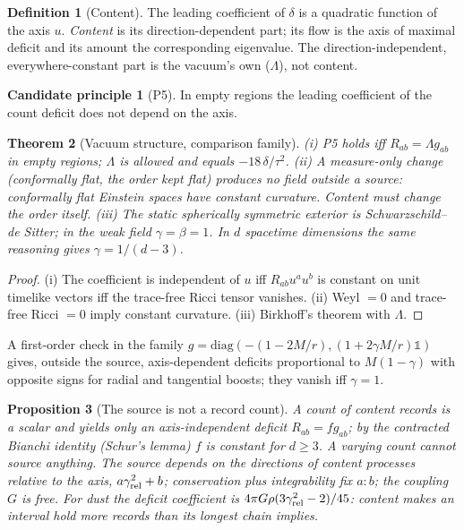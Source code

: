 \documentclass[11pt]{article}
\newtheorem{theorem}{Theorem}
\newtheorem{proposition}[theorem]{Proposition}
\theoremstyle{definition}
\newtheorem{definition}[theorem]{Definition}
\newtheorem{candidate}{Candidate principle}
\theoremstyle{remark}
\begin{document}
\begin{definition}[Content]
The leading coefficient of $\delta$ is a quadratic function of the axis $u$. \emph{Content} is its direction-dependent part; its flow is the axis of maximal deficit and its amount the corresponding eigenvalue. The direction-independent, everywhere-constant part is the vacuum's own ($\Lambda$), not content.
\end{definition}

\begin{candidate}[P5]\label{p5} In empty regions the leading coefficient of the count deficit does not depend on the axis.\end{candidate}

\begin{theorem}[Vacuum structure, comparison family]\label{thm:vac}
(i) P5 holds iff $R_{ab}=\Lambda g_{ab}$ in empty regions; $\Lambda$ is allowed and equals $-18\,\delta/\tau^2$. (ii) A measure-only change (conformally flat, the order kept flat) produces no field outside a source: conformally flat Einstein spaces have constant curvature. Content must change the order itself. (iii) The static spherically symmetric exterior is Schwarzschild--de Sitter; in the weak field $\gamma=\beta=1$. In $d$ spacetime dimensions the same reasoning gives $\gamma=1/(d-3)$.
\end{theorem}
\begin{proof}
(i) The coefficient is independent of $u$ iff $R_{ab}u^au^b$ is constant on unit timelike vectors iff the trace-free Ricci tensor vanishes. (ii) Weyl $=0$ and trace-free Ricci $=0$ imply constant curvature. (iii) Birkhoff's theorem \cite{birkhoff} with $\Lambda$.
\end{proof}

A first-order check in the family $g=\mathrm{diag}(-(1-2M/r),(1+2\gamma M/r)\mathbb{1})$ gives, outside the source, axis-dependent deficits proportional to $M(1-\gamma)$ with opposite signs for radial and tangential boosts; they vanish iff $\gamma=1$.

\begin{proposition}[The source is not a record count]
A count of content records is a scalar and yields only an axis-independent deficit $R_{ab}=f g_{ab}$; by the contracted Bianchi identity (Schur's lemma) $f$ is constant for $d\ge3$. A varying count cannot source anything. The source depends on the directions of content processes relative to the axis, $a\gamma_{\rm rel}^2+b$; conservation plus integrability fix $a:b$; the coupling $G$ is free. For dust the deficit coefficient is $4\pi G\rho(3\gamma_{\rm rel}^2-2)/45$: content makes an interval hold more records than its longest chain implies.
\end{proposition}
\end{document}
